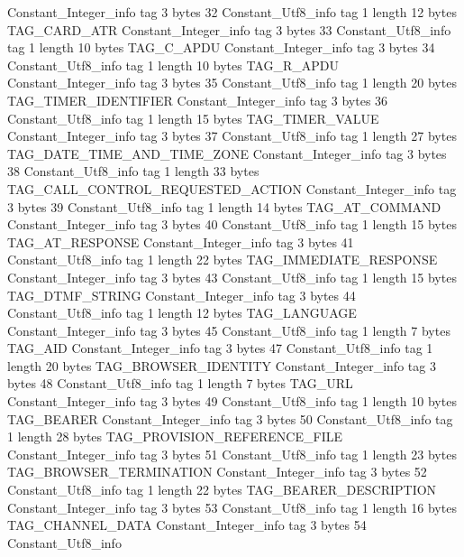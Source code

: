 {{{		}
		Constant_Integer_info {
			tag	3
			bytes	32
		}
		Constant_Utf8_info {
			tag	1
			length	12
			bytes	TAG_CARD_ATR
		}
		Constant_Integer_info {
			tag	3
			bytes	33
		}
		Constant_Utf8_info {
			tag	1
			length	10
			bytes	TAG_C_APDU
		}
		Constant_Integer_info {
			tag	3
			bytes	34
		}
		Constant_Utf8_info {
			tag	1
			length	10
			bytes	TAG_R_APDU
		}
		Constant_Integer_info {
			tag	3
			bytes	35
		}
		Constant_Utf8_info {
			tag	1
			length	20
			bytes	TAG_TIMER_IDENTIFIER
		}
		Constant_Integer_info {
			tag	3
			bytes	36
		}
		Constant_Utf8_info {
			tag	1
			length	15
			bytes	TAG_TIMER_VALUE
		}
		Constant_Integer_info {
			tag	3
			bytes	37
		}
		Constant_Utf8_info {
			tag	1
			length	27
			bytes	TAG_DATE_TIME_AND_TIME_ZONE
		}
		Constant_Integer_info {
			tag	3
			bytes	38
		}
		Constant_Utf8_info {
			tag	1
			length	33
			bytes	TAG_CALL_CONTROL_REQUESTED_ACTION
		}
		Constant_Integer_info {
			tag	3
			bytes	39
		}
		Constant_Utf8_info {
			tag	1
			length	14
			bytes	TAG_AT_COMMAND
		}
		Constant_Integer_info {
			tag	3
			bytes	40
		}
		Constant_Utf8_info {
			tag	1
			length	15
			bytes	TAG_AT_RESPONSE
		}
		Constant_Integer_info {
			tag	3
			bytes	41
		}
		Constant_Utf8_info {
			tag	1
			length	22
			bytes	TAG_IMMEDIATE_RESPONSE
		}
		Constant_Integer_info {
			tag	3
			bytes	43
		}
		Constant_Utf8_info {
			tag	1
			length	15
			bytes	TAG_DTMF_STRING
		}
		Constant_Integer_info {
			tag	3
			bytes	44
		}
		Constant_Utf8_info {
			tag	1
			length	12
			bytes	TAG_LANGUAGE
		}
		Constant_Integer_info {
			tag	3
			bytes	45
		}
		Constant_Utf8_info {
			tag	1
			length	7
			bytes	TAG_AID
		}
		Constant_Integer_info {
			tag	3
			bytes	47
		}
		Constant_Utf8_info {
			tag	1
			length	20
			bytes	TAG_BROWSER_IDENTITY
		}
		Constant_Integer_info {
			tag	3
			bytes	48
		}
		Constant_Utf8_info {
			tag	1
			length	7
			bytes	TAG_URL
		}
		Constant_Integer_info {
			tag	3
			bytes	49
		}
		Constant_Utf8_info {
			tag	1
			length	10
			bytes	TAG_BEARER
		}
		Constant_Integer_info {
			tag	3
			bytes	50
		}
		Constant_Utf8_info {
			tag	1
			length	28
			bytes	TAG_PROVISION_REFERENCE_FILE
		}
		Constant_Integer_info {
			tag	3
			bytes	51
		}
		Constant_Utf8_info {
			tag	1
			length	23
			bytes	TAG_BROWSER_TERMINATION
		}
		Constant_Integer_info {
			tag	3
			bytes	52
		}
		Constant_Utf8_info {
			tag	1
			length	22
			bytes	TAG_BEARER_DESCRIPTION
		}
		Constant_Integer_info {
			tag	3
			bytes	53
		}
		Constant_Utf8_info {
			tag	1
			length	16
			bytes	TAG_CHANNEL_DATA
		}
		Constant_Integer_info {
			tag	3
			bytes	54
		}
		Constant_Utf8_info {
}}}
